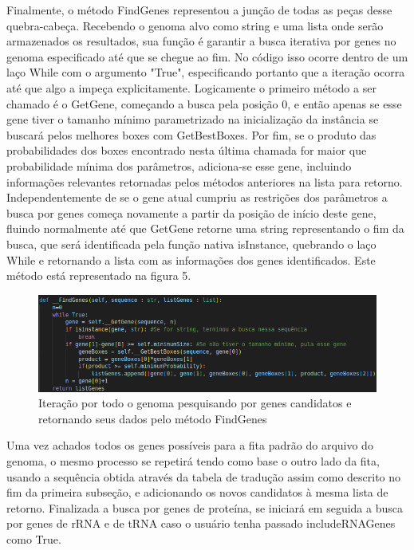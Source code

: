 \documentclass[brazilian,12pt,a4paper,final]{article}
\begin{document}
	
	\vspace{0.5cm}
Finalmente, o método FindGenes representou a junção de todas as peças desse quebra-cabeça. Recebendo o genoma alvo como string e uma lista onde serão armazenados os resultados, sua função é garantir a busca iterativa por genes no genoma especificado até que se chegue ao fim. No código isso ocorre dentro de um laço While com o argumento "True", especificando portanto que a iteração ocorra até que algo a impeça explicitamente. Logicamente o primeiro método a ser chamado é o GetGene, começando a busca pela posição 0, e então apenas se esse gene tiver o tamanho mínimo parametrizado na inicialização da instância se buscará pelos melhores boxes com GetBestBoxes. Por fim, se o produto das probabilidades dos boxes encontrado nesta última chamada for maior que probabilidade mínima dos parâmetros, adiciona-se esse gene, incluindo informações relevantes retornadas pelos métodos anteriores na lista para retorno. Independentemente de se o gene atual cumpriu as restrições dos parâmetros a busca por genes começa novamente a partir da posição de início deste gene, fluindo normalmente até que GetGene retorne uma string representando o fim da busca, que será identificada pela função nativa isInstance, quebrando o laço While e retornando a lista com as informações dos genes identificados. Este método está representado na figura 5.

\vspace{0.5cm}

\begin{figure}[hbtp]
	\begin{center}
		\includegraphics[]{../Figures/FindGenes.png}
		\caption{Iteração por todo o genoma pesquisando por genes candidatos e retornando seus dados pelo método FindGenes}
		\label{fig}
	\end{center}
\end{figure}

Uma vez achados todos os genes possíveis para a fita padrão do arquivo do genoma, o mesmo processo se repetirá tendo como base o outro lado da fita, usando a sequência obtida através da tabela de tradução assim como descrito no fim da primeira subseção, e adicionando os novos candidatos à mesma lista de retorno.
Finalizada a busca por genes de proteína, se iniciará em seguida a busca por genes de rRNA e de tRNA caso o usuário tenha passado includeRNAGenes como True.
\end{document}
